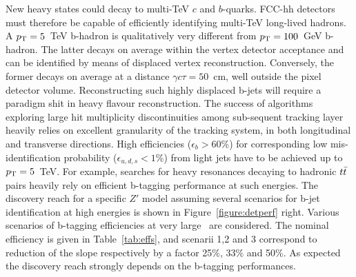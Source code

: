 New heavy states could decay to multi-TeV $c$ and $b$-quarks. FCC-hh detectors must therefore be capable of efficiently identifying multi-TeV long-lived hadrons. A $p_{\text{T}}=5$~TeV b-hadron is qualitatively very different from $p_{\text{T}}=100$~GeV b-hadron. The latter decays on average within the vertex detector acceptance and can be identified by means of displaced vertex reconstruction. Conversely, the former decays on average at a distance $\gamma c \tau = 50$~cm, well outside the pixel detector volume. Reconstructing such highly displaced b-jets will require a paradigm shit in heavy flavour reconstruction. The success of algorithms exploring large hit multiplicity discontinuities among sub-sequent tracking layer heavily relies on excellent granularity of the tracking system, in both longitudinal and transverse directions. High efficiencies ($\epsilon_b > 60\%$) for corresponding low mis-identification probability ($\epsilon_{u,d,s} < 1\%$) from light jets have to be achieved up to $p_{\text{T}}=5$~TeV. For example, searches for heavy resonances decaying to hadronic $t\bar{t}$ pairs heavily rely on efficient b-tagging performance at such energies. The discovery reach for a specific $Z'$ model assuming several scenarios for b-jet identification at high energies is shown in Figure~\ref{figure:detperf} right. Various scenarios of b-tagging efficiencies at very large \pt\ are considered. The nominal efficiency is given in Table~\ref{tab:effs}, and scenarii 1,2 and 3 correspond to reduction of the slope respectively by a factor 25\%, 33\% and 50\%. As expected the discovery reach strongly depends on the b-tagging performances.


